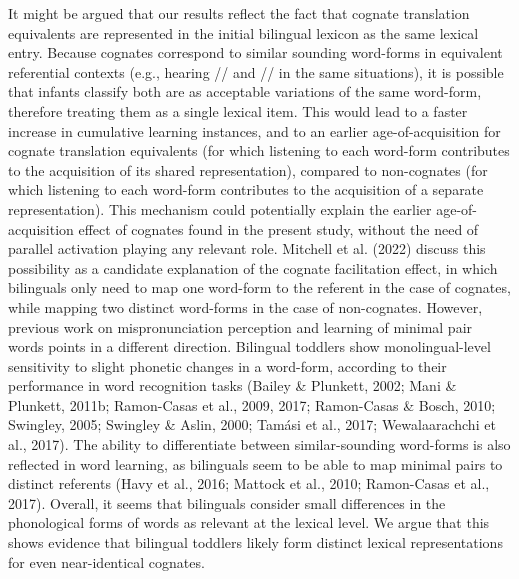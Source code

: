 \documentclass[
  12pt,
  b5paperpaper,
  twoside]{scrreprt}
\begin{document}
It might be argued that our results reflect the fact that cognate
translation equivalents are represented in the initial bilingual lexicon
as the same lexical entry. Because cognates correspond to similar
sounding word-forms in equivalent referential contexts (e.g., hearing
// and // in the same situations), it is
possible that infants classify both are as acceptable variations of the
same word-form, therefore treating them as a single lexical item. This
would lead to a faster increase in cumulative learning instances, and to
an earlier age-of-acquisition for cognate translation equivalents (for
which listening to each word-form contributes to the acquisition of its
shared representation), compared to non-cognates (for which listening to
each word-form contributes to the acquisition of a separate
representation). This mechanism could potentially explain the earlier
age-of-acquisition effect of cognates found in the present study,
without the need of parallel activation playing any relevant role.
Mitchell et al. (2022) discuss this possibility as a candidate
explanation of the cognate facilitation effect, in which bilinguals only
need to map one word-form to the referent in the case of cognates, while
mapping two distinct word-forms in the case of non-cognates. However,
previous work on mispronunciation perception and learning of minimal
pair words points in a different direction. Bilingual toddlers show
monolingual-level sensitivity to slight phonetic changes in a word-form,
according to their performance in word recognition tasks (Bailey \&
Plunkett, 2002; Mani \& Plunkett, 2011b; Ramon-Casas et al., 2009, 2017;
Ramon-Casas \& Bosch, 2010; Swingley, 2005; Swingley \& Aslin, 2000;
Tamási et al., 2017; Wewalaarachchi et al., 2017). The ability to
differentiate between similar-sounding word-forms is also reflected in
word learning, as bilinguals seem to be able to map minimal pairs to
distinct referents (Havy et al., 2016; Mattock et al., 2010; Ramon-Casas
et al., 2017). Overall, it seems that bilinguals consider small
differences in the phonological forms of words as relevant at the
lexical level. We argue that this shows evidence that bilingual toddlers
likely form distinct lexical representations for even near-identical
cognates.
\end{document}
